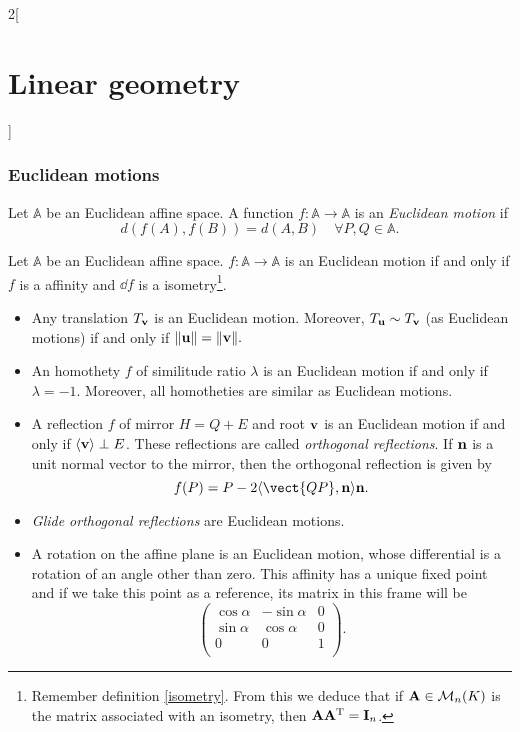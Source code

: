 \documentclass[../../../main.tex]{subfiles}
\begin{document}
\begin{multicols}{2}[\section{Linear geometry}]
    \subsubsection*{Euclidean motions}
    \label{LG-euclidean_motion}
    \begin{definition}
        Let $\mathbb{A}$ be an Euclidean affine space. A function $f:\mathbb{A}\rightarrow\mathbb{A}$ is an \textit{Euclidean motion} if $$d(f(A),f(B))=d(A,B)\quad\forall P,Q\in\mathbb{A}.$$
    \end{definition}
    \begin{prop}
        Let $\mathbb{A}$ be an Euclidean affine space. $f:\mathbb{A}\rightarrow\mathbb{A}$ is an Euclidean motion if and only if $f$ is a affinity and $\dd f$ is a isometry\footnote{Remember definition \ref{isometry}. From this we deduce that if $\boldsymbol{\mathrm{A}}\in\mathcal{M}_n(K)$ is the matrix associated with an isometry, then $\boldsymbol{\mathrm{A}}\vb{A}^{\mathrm{T}}=\boldsymbol{\mathrm{I}}_n$.}.
    \end{prop}
    \begin{prop}
        \hfill
        \begin{itemize}
            \item Any translation $T_{\boldsymbol{\mathrm{v}}}$ is an Euclidean motion. Moreover, $T_{\boldsymbol{\mathrm{u}}}\sim T_{\boldsymbol{\mathrm{v}}}$ (as Euclidean motions) if and only if $\|\boldsymbol{\mathrm{u}}\|=\|\boldsymbol{\mathrm{v}}\|.$
            \item An homothety $f$ of similitude ratio $\lambda$ is an Euclidean motion if and only if $\lambda=-1$. Moreover, all homotheties are similar as Euclidean motions.
            \item A reflection $f$ of mirror $H=Q+E$ and root $\boldsymbol{\mathrm{v}}$ is an Euclidean motion if and only if $\langle\boldsymbol{\mathrm{v}}\rangle\perp E$. These reflections are called \textit{orthogonal reflections}. If $\boldsymbol{\mathrm{n}}$ is a unit normal vector to the mirror, then the orthogonal reflection is given by $$f(P)=P-2\langle\vect{QP},\vectorfunction{n}\rangle\vectorfunction{n}.$$
            \item \textit{Glide orthogonal reflections} are Euclidean motions.
            \item A rotation on the affine plane is an Euclidean motion, whose differential is a rotation of an angle other than zero. This affinity has a unique fixed point and if we take this point as a reference, its matrix in this frame will be $$\begin{pmatrix}
                          \cos\alpha & -\sin\alpha & 0 \\
                          \sin\alpha & \cos\alpha  & 0 \\
                          0          & 0           & 1 \\
                      \end{pmatrix}.$$
        \end{itemize}
    \end{prop}

\end{multicols}
\end{document}
